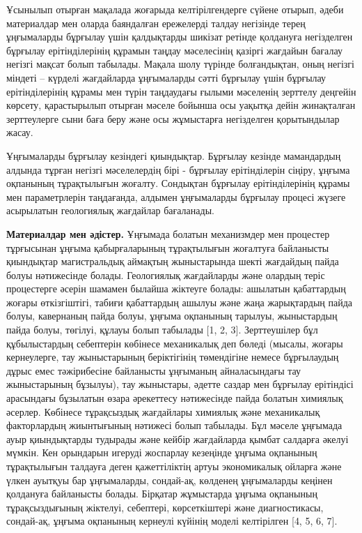 \begin{multicols}{2}
Ұсынылып отырған мақалада жоғарыда келтірілгендерге сүйене отырып, әдеби
материалдар мен оларда баяндалған ережелерді талдау негізінде терең
ұңғымаларды бұрғылау үшін қалдықтарды шикізат ретінде қолдануға
негізделген бұрғылау ерітінділерінің құрамын таңдау мәселесінің қазіргі
жағдайын бағалау негізгі мақсат болып табылады. Мақала шолу түрінде
болғандықтан, оның негізгі міндеті -- күрделі жағдайларда ұңғымаларды
сәтті бұрғылау үшін бұрғылау ерітінділерінің құрамы мен түрін таңдаудағы
ғылыми мәселенің зерттелу деңгейін көрсету, қарастырылып отырған мәселе
бойынша осы уақытқа дейін жинақталған зерттеулерге сыни баға беру және
осы жұмыстарға негізделген қорытындылар жасау.

Ұңғымаларды бұрғылау кезіндегі қиындықтар. Бұрғылау кезінде мамандардың
алдында тұрған негізгі мәселелердің бірі - бұрғылау ерітінділерін
сіңіру, ұңғыма оқпанының тұрақтылығын жоғалту. Сондықтан бұрғылау
ерітінділерінің құрамы мен параметрлерін таңдағанда, алдымен ұңғымаларды
бұрғылау процесі жүзеге асырылатын геологиялық жағдайлар бағаланады.

{\bfseries Материалдар мен әдістер.} Ұңғымада болатын механизмдер мен
процестер тұрғысынан ұңғыма қабырғаларының тұрақтылығын жоғалтуға
байланысты қиындықтар магистральдық аймақтың жыныстарында шекті
жағдайдың пайда болуы нәтижесінде болады. Геологиялық жағдайларды және
олардың теріс процестерге әсерін шамамен былайша жіктеуге болады:
ашылатын қабаттардың жоғары өткізгіштігі, табиғи қабаттардың ашылуы және
жаңа жарықтардың пайда болуы, кавернаның пайда болуы, ұңғыма оқпанының
тарылуы, жыныстардың пайда болуы, төгілуі, құлауы болып табылады {[}1,
2, 3{]}. Зерттеушілер бұл құбылыстардың себептерін көбінесе механикалық
деп бөледі (мысалы, жоғары кернеулерге, тау жыныстарының беріктігінің
төмендігіне немесе бұрғылаудың дұрыс емес тәжірибесіне байланысты
ұңғыманың айналасындағы тау жыныстарының бұзылуы), тау жыныстары, әдетте
саздар мен бұрғылау ерітіндісі арасындағы бұзылатын өзара әрекеттесу
нәтижесінде пайда болатын химиялық әсерлер. Көбінесе тұрақсыздық
жағдайлары химиялық және механикалық факторлардың жиынтығының нәтижесі
болып табылады. Бұл мәселе ұңғымада ауыр қиындықтарды тудырады және
кейбір жағдайларда қымбат салдарға әкелуі мүмкін. Кен орындарын игеруді
жоспарлау кезеңінде ұңғыма оқпанының тұрақтылығын талдауға деген
қажеттіліктің артуы экономикалық ойларға және үлкен ауытқуы бар
ұңғымаларды, сондай-ақ, көлденең ұңғымаларды кеңінен қолдануға
байланысты болады. Бірқатар жұмыстарда ұңғыма оқпанының тұрақсыздығының
жіктелуі, себептері, көрсеткіштері және диагностикасы, сондай-ақ, ұңғыма
оқпанының кернеулі күйінің моделі келтірілген {[}4, 5, 6, 7{]}.


\end{multicols}
